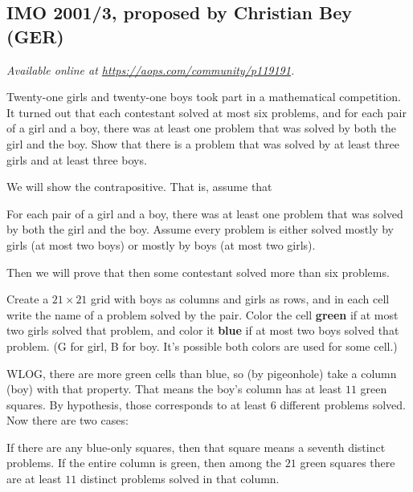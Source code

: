 \documentclass[11pt]{scrartcl}
\begin{document}
\subsection{IMO 2001/3, proposed by Christian Bey (GER)}
\textsl{Available online at \url{https://aops.com/community/p119191}.}
\begin{mdframed}[style=mdpurplebox,frametitle={Problem statement}]
Twenty-one girls and twenty-one boys took part in a mathematical competition.
It turned out that each contestant solved at most six problems,
and for each pair of a girl and a boy,
there was at least one problem that was solved by both the girl and the boy.
Show that there is a problem that was solved by at least three girls and at least three boys.
\end{mdframed}
We will show the contrapositive.
That is, assume that
\begin{itemize}
  \ii For each pair of a girl and a boy,
  there was at least one problem that was
  solved by both the girl and the boy.
  \ii Assume every problem is either solved
  mostly by girls (at most two boys)
  or mostly by boys (at most two girls).
\end{itemize}
Then we will prove that then some contestant
solved more than six problems.

Create a $21 \times 21$ grid with boys as columns
and girls as rows, and in each cell
write the name of a problem solved by the pair.
Color the cell \textbf{green} if at most two girls solved that problem,
and color it \textbf{blue} if at most two boys solved that problem.
(G for girl, B for boy.
It's possible both colors are used for some cell.)

WLOG, there are more green cells than blue,
so (by pigeonhole) take a column (boy) with that property.
That means the boy's column has at least $11$ green squares.
By hypothesis, those corresponds to at least $6$ different problems
solved. Now there are two cases:
\begin{itemize}
  \ii If there are any blue-only squares,
  then that square means a seventh distinct problems.
  \ii If the entire column is green,
  then among the $21$ green squares
  there are at least $11$ distinct problems solved
  in that column.
\end{itemize}
\end{document}
